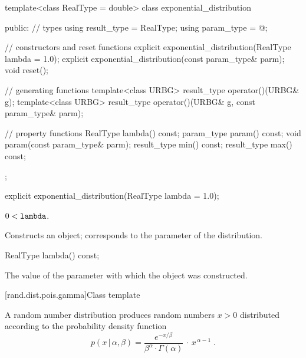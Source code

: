 %
\begin{codeblock}
template<class RealType = double>
 class exponential_distribution
{
public:
 // types
 using result_type = RealType;
 using param_type  = @\unspec@;

 // constructors and reset functions
 explicit exponential_distribution(RealType lambda = 1.0);
 explicit exponential_distribution(const param_type& parm);
 void reset();

 // generating functions
 template<class URBG>
   result_type operator()(URBG& g);
 template<class URBG>
   result_type operator()(URBG& g, const param_type& parm);

 // property functions
 RealType lambda() const;
 param_type param() const;
 void param(const param_type& parm);
 result_type min() const;
 result_type max() const;
};
\end{codeblock}


%
\begin{itemdecl}
explicit exponential_distribution(RealType lambda = 1.0);
\end{itemdecl}

\begin{itemdescr}
\pnum\requires
 $ 0 < \texttt{lambda} $.

\pnum\effects Constructs an  object;
 corresponds to the parameter of the distribution.
\end{itemdescr}

%
\begin{itemdecl}
RealType lambda() const;
\end{itemdecl}

\begin{itemdescr}
\pnum\returns The value of the  parameter
 with which the object was constructed.
\end{itemdescr}


[rand.dist.pois.gamma]{Class template }%
%
%

\pnum
A  random number distribution
produces random numbers $x > 0$
distributed according to
the probability density function%
%
%
\[%
 p(x\,|\,\alpha,\beta)
      = \frac{e^{-x/\beta}}{\beta^{\alpha} \cdot \Gamma(\alpha)}
        \, \cdot \, x^{\, \alpha-1}
\; \mbox{.}
\]

